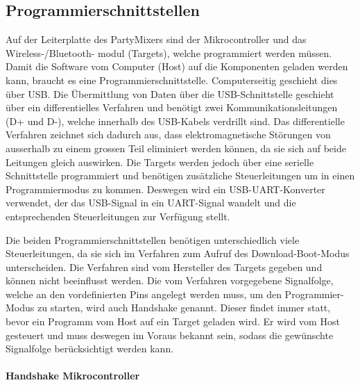 \subsection{Programmierschnittstellen}
\label{subsec:Programmierschnittstellen}

Auf der Leiterplatte des PartyMixers sind der Mikrocontroller und das Wireless-/Bluetooth- modul (Targets), welche programmiert werden müssen. Damit die Software vom Computer (Host) auf die Komponenten geladen werden kann, braucht es eine Programmierschnittstelle. Computerseitig geschieht dies über USB.
Die Übermittlung von Daten über die USB-Schnittstelle geschieht über ein differentielles Verfahren und benötigt zwei Kommunikationsleitungen (D+ und D-), welche innerhalb des USB-Kabels verdrillt sind. Das differentielle Verfahren zeichnet sich dadurch aus, dass elektromagnetische Störungen von ausserhalb zu einem grossen Teil eliminiert werden können, da sie sich auf beide Leitungen gleich auswirken. Die Targets werden jedoch über eine serielle Schnittstelle programmiert und benötigen zusätzliche Steuerleitungen um in einen Programmiermodus zu kommen. Deswegen wird ein USB-UART-Konverter verwendet, der das USB-Signal in ein UART-Signal wandelt und die entsprechenden Steuerleitungen zur Verfügung stellt. 

Die beiden Programmierschnittstellen benötigen unterschiedlich viele Steuerleitungen, da sie sich im Verfahren zum Aufruf des Download-Boot-Modus unterscheiden. Die Verfahren sind vom Hersteller des Targets gegeben und können nicht beeinflusst werden.
Die vom Verfahren vorgegebene Signalfolge, welche an den vordefinierten Pins angelegt werden muss, um den Programmier-Modus zu starten, wird auch Handshake genannt. Dieser findet immer statt, bevor ein Programm vom Host auf ein Target geladen wird.
Er wird vom Host gesteuert und muss deswegen im Voraus bekannt sein, sodass die gewünschte Signalfolge berücksichtigt werden kann.

\paragraph{Handshake Mikrocontroller}\mbox{}


